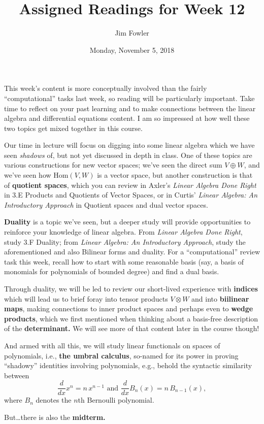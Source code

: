 \documentclass{homework}
\author{Jim Fowler}
\title{Assigned Readings for Week 12}
\date{Monday, November 5, 2018}
\begin{document}
\maketitle

This week's content is more conceptually involved than the fairly
``computational'' tasks last week, so reading will be particularly
important. Take time to reflect on your past learning and to make
connections between the linear algebra and differential equations
content. I am so impressed at how well these two topics get mixed
together in this course.

Our time in lecture will focus on digging into some linear algebra
which we have seen \textit{shadows} of, but not yet discussed in depth
in class.  One of these topics are various constructions for new
vector spaces; we've seen the direct sum $V \oplus W$, and we've seen
how $\mathrm{Hom}(V,W)$ is a vector space, but another construction is
that of \textbf{quotient spaces}, which you can review in Axler's
\textit{Linear Algebra Done Right} in \textsection 3.E Products and
Quotients of Vector Spaces, or in Curtis' \textit{Linear Algebra: An
Introductory Approach} in  Quotient spaces and dual
vector spaces.

\textbf{Duality} is a topic we've seen, but a deeper study will
provide opportunities to reinforce your knowledge of linear algebra.
From \textit{Linear Algebra Done Right}, study \textsection 3.F
Duality; from \textit{Linear Algebra: An Introductory Approach}, study
the aforementioned  and also  Bilinear
forms and duality.  For a ``computational'' review task this week,
recall how to start with some reasonable basis (say, a basis of
monomials for polynomials of bounded degree) and find a dual basis.

Through duality, we will be led to review our short-lived experience
with \textbf{indices} which will lead us to brief foray into tensor
products $V \otimes W$ and into \textbf{biilinear maps}, making
connections to inner product spaces and perhaps even to \textbf{wedge
products}, which we first mentioned when thinking about a basis-free
description of the \textbf{determinant.} We will see more of that
content later in the course though!

And armed with all this, we will study linear
functionals on spaces of polynomials, i.e., \textbf{the umbral
  calculus}, so-named for its power in proving ``shadowy'' identities
involving polynomials, e.g., behold the syntactic similarity between
\[
 \frac {d}{dx} x^{n}=n\,x^{n-1} \mbox{ and } {\frac {d}{dx}}B_{n}(x)=n \, B_{n-1}(x),
\]
where $B_n$ denotes the $n$th Bernoulli polynomial.

But\ldots there is also the \textbf{midterm.}
\end{document}
